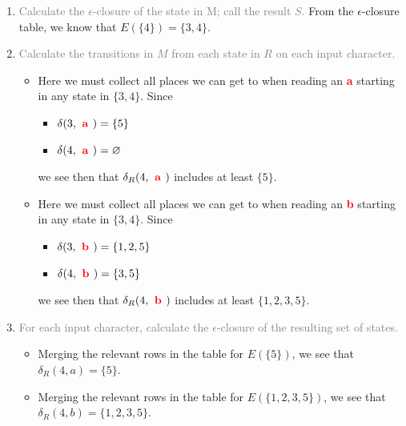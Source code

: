 \documentclass{article}
\begin{document}
\begin{enumerate}
    \item \textcolor{gray}{Calculate the $\epsilon$-closure of the state in M; call the result $S$.} 
    From the $\epsilon$-closure table, we know that $E(\{ 4 \})=\{ {3, 4} \}$. 
    
    \item \textcolor{gray}{Calculate the transitions in $M$ from each state in $R$ on each input character.} 
    \begin{itemize}
        
            \item [\textcolor{red}{\textbf{ a }}] 
            Here we must collect all places we can get to when reading an \textcolor{red}{\textbf{ a }}
            starting in any state in $\{ {3, 4} \}$. 
            Since
            \begin{itemize}\item $\delta(3, \textcolor{red}{\textbf{ a }}) = \{5\}
$\item $\delta(4, \textcolor{red}{\textbf{ a }}) = \varnothing
$
            \end{itemize}
            we see then that $\delta_R(4,\textcolor{red}{\textbf{ a }})$ includes at least $\{ {5} \}$.
        
            \item [\textcolor{red}{\textbf{ b }}] 
            Here we must collect all places we can get to when reading an \textcolor{red}{\textbf{ b }}
            starting in any state in $\{ {3, 4} \}$. 
            Since
            \begin{itemize}\item $\delta(3, \textcolor{red}{\textbf{ b }}) = \{1,2,5\}
$\item $\delta(4, \textcolor{red}{\textbf{ b }}) = \{3,5\}
$
            \end{itemize}
            we see then that $\delta_R(4,\textcolor{red}{\textbf{ b }})$ includes at least $\{ {1, 2, 3, 5} \}$.
        
    \end{itemize}

    \item \textcolor{gray}{For each input character, calculate the $\epsilon$-closure of the resulting set of states.}   
    \begin{itemize}
    
            \item [\textcolor{red}{\textbf{ a }}] 
            Merging the relevant rows in the table for $E(\{ {5} \})$, 
            we see that $\delta_R( 4, a )=\{ {5} \}$. 
        
            \item [\textcolor{red}{\textbf{ b }}] 
            Merging the relevant rows in the table for $E(\{ {1, 2, 3, 5} \})$, 
            we see that $\delta_R( 4, b )=\{ {1, 2, 3, 5} \}$. 
        
    \end{itemize}
\end{enumerate}
\end{document}
